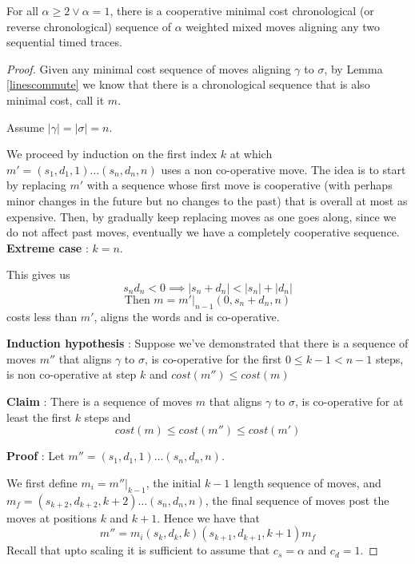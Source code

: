 \documentclass[runningheads]{llncs}
\begin{document}
    \begin{lemma}\label{linescoop} For all $\alpha \geq 2 \vee \alpha = 1$, there is a cooperative minimal cost chronological (or reverse chronological) sequence of $\alpha$ weighted mixed moves aligning any two sequential timed traces. 
    \end{lemma}
    \begin{proof}
        Given any minimal cost sequence of moves aligning $\gamma$ to $\sigma$, by Lemma \ref{linescommute} we know that there is a chronological sequence that is also minimal cost, call it $m$. 
        
        Assume $|\gamma| = |\sigma| = n$. 
        
        We proceed by induction on the first index $k$ at which $m' = (s_1, d_1, 1)\dots(s_n, d_n, n)$ uses a non co-operative move. 
        The idea is to start by replacing $m'$ with a sequence whose first move is cooperative (with perhaps minor changes in the future but no changes to the past) that is overall at most as expensive. 
        Then, by gradually keep replacing moves as one goes along, since we do not affect past moves, eventually we have a completely cooperative sequence. 
        \textbf{Extreme case} : $k = n$.
        
        This gives us $$s_n d_n < 0 \implies |s_n + d_n| < |s_n| + |d_n|$$ 
        $$\textrm{Then } m = m'|_{n-1}(0, s_n + d_n, n)$$ costs less than $m'$, aligns the words and is co-operative. 
        
        \textbf{Induction hypothesis} : Suppose we've demonstrated that there is a sequence of moves $m''$ that aligns $\gamma$ to $\sigma$, is co-operative for the first $0 \leq k-1 < n-1$ steps, is non co-operative at step $k$ and $cost(m'') \leq cost(m)$
        
        \textbf{Claim} : There is a sequence of moves $m$ that aligns $\gamma$ to $\sigma$, is co-operative for at least the first $k$ steps and $$cost(m) \leq cost(m'') \leq cost(m')$$
        
        \textbf{Proof} : Let $m'' = (s_1, d_1, 1)\dots(s_n, d_n, n)$. 
        
        We first define $m_i = m''|_{k-1}$, the initial $k-1$ length sequence of moves, and $m_f = (s_{k+2}, d_{k+2}, k+2)\dots (s_n, d_n, n)$, the final sequence of moves post the moves at positions $k$ and $k+1$. 
        Hence we have that $$m'' = m_i(s_k, d_k, k)(s_{k+1}, d_{k+1}, k+1)m_f$$
        Recall that upto scaling it is sufficient to assume that $c_s = \alpha$ and $c_d = 1$. 
        

\end{proof}
\end{document}
